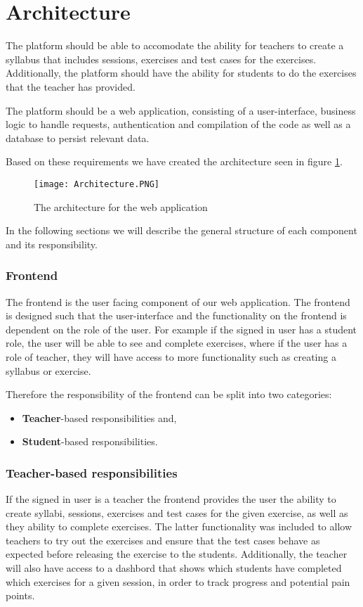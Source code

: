 \section{Architecture}
The platform should be able to accomodate the ability for teachers to create a syllabus that includes sessions, exercises and test cases for the exercises. Additionally, the platform should have the ability for students to do the exercises that the teacher has provided. 

The platform should be a web application, consisting of a user-interface, business logic to handle requests, authentication and compilation of the code as well as a database to persist relevant data.

Based on these requirements we have created the architecture seen in figure \ref{fig:Architecture}.

\begin{figure}[H]
	\texttt{[image: Architecture.PNG]}
	\centering
	\caption{The architecture for the web application}
	\label{fig:Architecture}
\end{figure}

In the following sections we will describe the general structure of each component and its responsibility.

\subsubsection{Frontend}
The frontend is the user facing component of our web application. The frontend is designed such that the user-interface and the functionality on the frontend is dependent on the role of the user. 
For example if the signed in user has a student role, the user will be able to see and complete exercises, where if the user has a role of teacher, they will have access to more functionality such as creating a syllabus or exercise.

Therefore the responsibility of the frontend can be split into two categories: 
\begin{itemize}
    \item \textbf{Teacher}-based responsibilities and,
    \item \textbf{Student}-based responsibilities.
\end{itemize}

\subsubsection*{Teacher-based responsibilities}
If the signed in user is a teacher the frontend provides the user the ability to create syllabi, sessions, exercises and test cases for the given exercise, as well as they ability to complete exercises. The latter functionality was included to allow teachers to try out the exercises and ensure that the test cases behave as expected before releasing the exercise to the students. Additionally, the teacher will also have access to a dashbord that shows which students have completed which exercises for a given session, in order to track progress and potential pain points.

